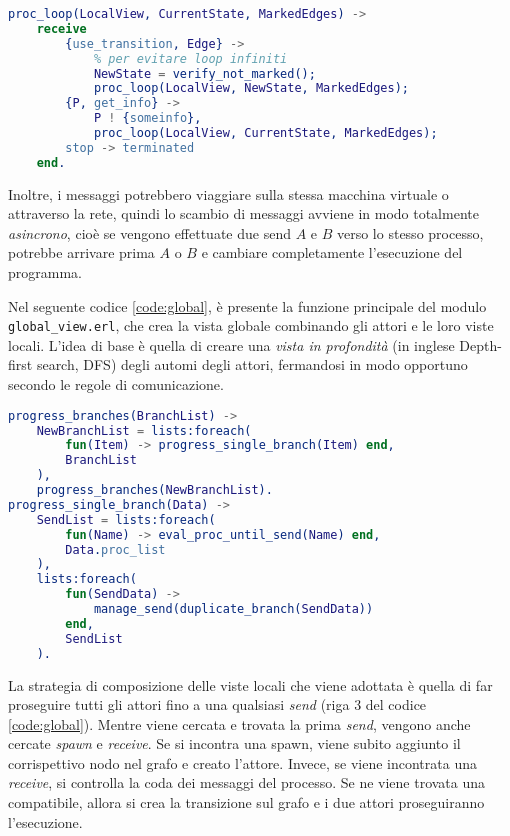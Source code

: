 \bigskip

\begin{lstlisting}[language=Erlang, caption=Funzione \texttt{proc\_loop} che simula un attore]
proc_loop(LocalView, CurrentState, MarkedEdges) ->
    receive
        {use_transition, Edge} ->
            % per evitare loop infiniti
            NewState = verify_not_marked();
            proc_loop(LocalView, NewState, MarkedEdges);
        {P, get_info} ->
            P ! {someinfo},
            proc_loop(LocalView, CurrentState, MarkedEdges);
        stop -> terminated
    end.
\end{lstlisting}

\bigskip

Inoltre, i messaggi potrebbero viaggiare sulla stessa macchina virtuale o attraverso la rete, quindi lo scambio di messaggi avviene in modo totalmente \textit{asincrono}, cio\`e se vengono effettuate due send $A$ e $B$ verso lo stesso processo, potrebbe arrivare prima $A$ o $B$ e cambiare completamente l'esecuzione del programma.

\bigskip

Nel seguente codice \ref{code:global}, \`e presente la funzione principale del modulo \texttt{global\_view.erl}, che crea la vista globale combinando gli attori e le loro viste locali. L'idea di base \`e quella di creare una \textit{vista in profondit\`a} (in inglese Depth-first search, DFS) degli automi degli attori, fermandosi in modo opportuno secondo le regole di comunicazione.

\bigskip

\begin{lstlisting}[language=Erlang, caption=Codice principale per costruire una vista globale, label=code:global]
progress_branches(BranchList) ->
    NewBranchList = lists:foreach(
        fun(Item) -> progress_single_branch(Item) end,
        BranchList
    ),
    progress_branches(NewBranchList).
progress_single_branch(Data) ->
    SendList = lists:foreach(
        fun(Name) -> eval_proc_until_send(Name) end,
        Data.proc_list
    ),
    lists:foreach(
        fun(SendData) -> 
            manage_send(duplicate_branch(SendData))
        end,
        SendList
    ).
\end{lstlisting}

La strategia di composizione delle viste locali che viene adottata \`e quella di far proseguire tutti gli attori fino a una qualsiasi \textit{send} (riga 3 del codice \ref{code:global}). Mentre viene cercata e trovata la prima \textit{send}, vengono anche cercate \textit{spawn} e \textit{receive}. Se si incontra una spawn, viene subito aggiunto il corrispettivo nodo nel grafo e creato l'attore. Invece, se viene incontrata una \textit{receive}, si controlla la coda dei messaggi del processo. Se ne viene trovata una compatibile, allora si crea la transizione sul grafo e i due attori proseguiranno l'esecuzione.

